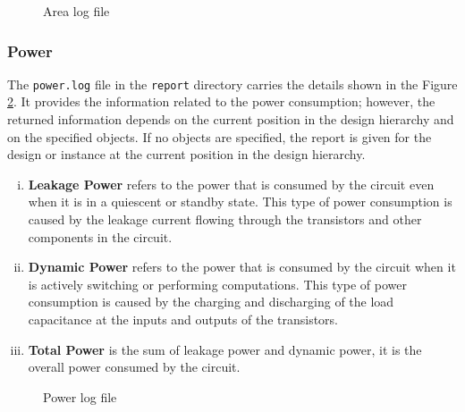 \documentclass[a4paper,11pt]{article}%
\begin{document}
\begin{figure}[h]
	\centering
	\caption{Area log file}
	\label{fig:area_log}
\end{figure}


\subsubsection{Power}
The {\tt power.log} file in the {\tt report} directory carries the details shown in the Figure \ref{fig:power_log}. It provides the information related to the power consumption; however, the returned information depends on the current position in the design hierarchy and on the specified objects. If no objects are specified, the report is given for the design or instance at the current position in the design hierarchy\cite{genus_command_ref_2019}.

\begin{enumerate}[i.] %
	\item \textbf{Leakage Power} refers to the power that is consumed by the circuit even when it is in a quiescent or standby state. This type of power consumption is caused by the leakage current flowing through the transistors and other components in the circuit.
	
	\item \textbf{Dynamic Power} refers to the power that is consumed by the circuit when it is actively switching or performing computations. This type of power consumption is caused by the charging and discharging of the load capacitance at the inputs and outputs of the transistors.
	
	\item \textbf{Total Power} is the sum of leakage power and dynamic power, it is the overall power consumed by the circuit.
\end{enumerate}


\begin{figure}[h]
	\centering
	\caption{Power log file}
	\label{fig:power_log}
\end{figure}
\end{document}
